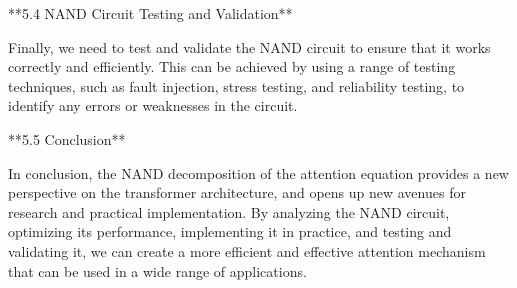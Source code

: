 **5.4 NAND Circuit Testing and Validation**













Finally, we need to test and validate the NAND circuit to ensure that it works correctly and efficiently. This can be achieved by using a range of testing techniques, such as fault injection, stress testing, and reliability testing, to identify any errors or weaknesses in the circuit.













**5.5 Conclusion**













In conclusion, the NAND decomposition of the attention equation provides a new perspective on the transformer architecture, and opens up new avenues for research and practical implementation. By analyzing the NAND circuit, optimizing its performance, implementing it in practice, and testing and validating it, we can create a more efficient and effective attention mechanism that can be used in a wide range of applications.























































